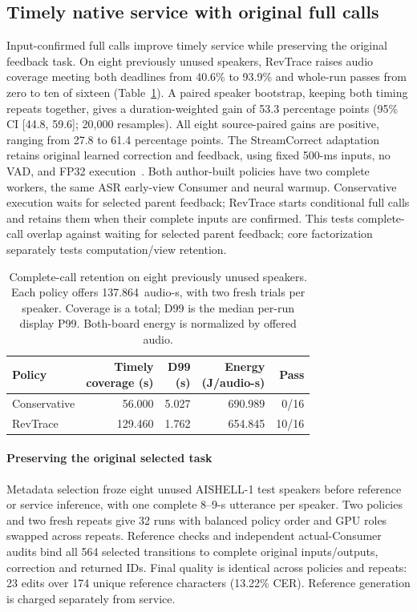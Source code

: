 \subsection{Timely native service with original full calls}
\label{subsec:native_retention_eval}
Input-confirmed full calls improve timely service while preserving the
original feedback task. On eight previously unused speakers, RevTrace
raises audio coverage meeting both deadlines from 40.6\% to 93.9\% and
whole-run passes from zero to ten of sixteen
(Table~\ref{tab:native_full_confirm}). A paired speaker bootstrap,
keeping both timing repeats together, gives a duration-weighted gain
of 53.3 percentage points (95\% CI [44.8, 59.6]; 20,000 resamples).
All eight source-paired gains are positive, ranging from 27.8 to 61.4
percentage points.
The StreamCorrect adaptation retains
original learned correction and feedback, using fixed 500-ms inputs,
no VAD, and FP32 execution~\cite{vu2026streamcorrect}. Both author-built
policies have two complete workers, the same ASR early-view Consumer and
neural warmup. Conservative execution waits for selected parent feedback;
RevTrace starts conditional full calls and retains them when their
complete inputs are confirmed. This tests complete-call overlap against
waiting for selected parent feedback; core factorization separately tests
computation/view retention.

\begin{table}[t]
\centering
\caption{Complete-call retention on eight previously unused speakers.
Each policy offers 137.864~audio-s, with two fresh trials per speaker.
Coverage is a total; D99 is the median per-run display P99.
Both-board energy is normalized by offered audio.}
\label{tab:native_full_confirm}
\small\setlength{\tabcolsep}{3pt}
\begin{tabular}{@{}lrrrr@{}}
\toprule
Policy & \shortstack{Timely\\coverage (s)} & \shortstack{D99\\(s)} &
\shortstack{Energy\\(J/audio-s)} & Pass\\
\midrule
Conservative & 56.000 & 5.027 & 690.989 & 0/16\\
RevTrace & 129.460 & 1.762 & 654.845 & 10/16\\
\bottomrule
\end{tabular}
\end{table}

\paragraph{Preserving the original selected task}
Metadata selection froze eight unused AISHELL-1 test speakers
\cite{bu2017aishell} before reference or service inference, with one complete
8--9-s utterance per speaker. Two policies and two fresh repeats give
32 runs with balanced policy order and GPU roles swapped across repeats.
Reference checks and independent actual-Consumer audits bind all 564
selected transitions to complete original inputs/outputs, correction and
returned IDs. Final quality is identical across policies and repeats:
23 edits over 174 unique reference characters (13.22\% CER).
Reference generation is charged separately from service.

